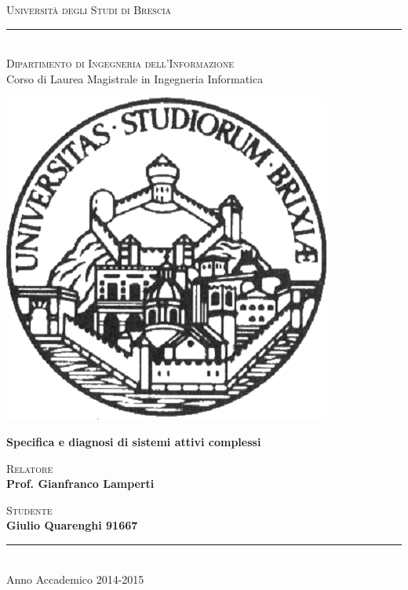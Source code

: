 \documentclass[12pt,a4paper,oneside]{book}
\begin{document}
\begin{titlepage}
\begin{center}
{{\Large{\textsc{Università degli Studi di Brescia}}}\\
\rule{0.5\textwidth}{0.1mm}
\vspace{10mm}
\textsc{\\Dipartimento di Ingegneria dell'Informazione\\}
Corso di Laurea Magistrale in Ingegneria Informatica}
\end{center}
\vspace{25mm}
\begin{center}
\includegraphics[width=.33\columnwidth]{../Logo/logo.png}
\end{center}
\vspace{10mm}

\begin{center}
{\LARGE{\textbf{Specifica e diagnosi di sistemi attivi complessi}}}
\end{center}
\vspace{5mm}
\par
\noindent
\begin{minipage}[t]{0.47\textwidth}
\vspace{20mm}
{{\textsc{Relatore}\\
\textbf{Prof. Gianfranco Lamperti}
}}
\end{minipage}
\hfill
\begin{minipage}[t]{0.47\textwidth}\raggedleft
{{\vspace{20mm}
\textsc{ Studente}\\
\textbf {Giulio Quarenghi 91667}\\

}}
\end{minipage}
\vspace{25mm}

\begin{center}
\rule{0.5\textwidth}{0.1mm}\\
\vspace{10mm}
{\large{ Anno Accademico 2014-2015}}%
\end{center}
\end{titlepage}
\end{document}
